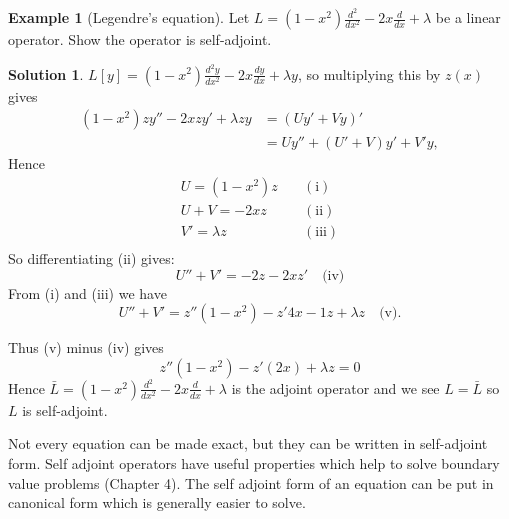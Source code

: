 \documentclass{article}
\theoremstyle{plain}
\theoremstyle{definition}
\newtheorem{exmp}{Example}[section]
\newtheorem*{sol}{Solution}
\numberwithin{equation}{section}
\begin{document}
\begin{tcolorbox}
    \begin{exmp}[Legendre's equation]
        Let $L=(1-x^2)\frac{d^2}{dx^2} - 2x\frac{d}{dx} + \lambda $ be a linear operator. Show the operator is self-adjoint.
    \end{exmp}
    \begin{sol}
        $L[y] = (1-x^2)\frac{d^2y}{dx^2} - 2x\frac{dy}{dx} + \lambda y$, so multiplying this by $z(x)$ gives
        \begin{align*}
            (1-x^2)zy'' -2xzy' + \lambda z y &= \left( Uy' + Vy\right)' \\
            &= Uy'' + (U'+V)y' + V'y,
        \end{align*}
        Hence
        \[ \begin{matrix}
            U=(1-x^2)z & \quad (\text{i}) \\
            U + V = -2xz & \quad (\text{ii}) \\
            V' = \lambda z  & \quad (\text{iii}) \\
        \end{matrix} \]
        So differentiating (ii) gives:
        \[ U''+V' = -2z-2xz' \quad \text{(iv)}\]
        From (i) and (iii) we have
        \[ U'' + V' = z''(1-x^2) - z'4x-1z + \lambda z \quad \text{(v)}. \]
    \end{sol}
\end{tcolorbox}
\begin{tcolorbox}
        Thus (v) minus (iv) gives
        \[ z''(1-x^2) - z'(2x) + \lambda z = 0\]
        Hence $\bar{L} = (1-x^2)\frac{d^2}{dx^2} -2x \frac{d}{dx} + \lambda $ is the adjoint operator and we see $L=\bar{L}$ so $L$ is self-adjoint.
\end{tcolorbox}

Not every equation can be made exact, but they can be written in self-adjoint form. Self adjoint operators have useful properties which help to solve boundary value problems (Chapter 4). The self adjoint form of an equation can be put in canonical form which is generally easier to solve.
\end{document}
